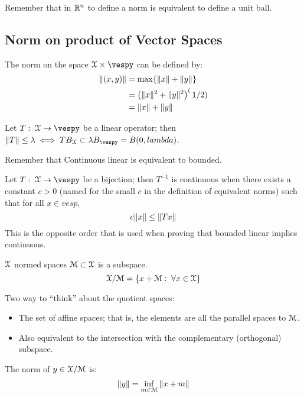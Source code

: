 Remember that in $\mathbb{R}^n$ to define a norm is equivalent to define a unit ball.

\subsection{Norm on product of Vector Spaces}
\begin{examples}
The norm on the space $\vesp\times \vespy$ can be defined by:
\begin{align*}
\Vert (x,y) \Vert &= \max\{\Vert x\Vert + \Vert y \Vert\}\\
            &= \left(\Vert x\Vert^2 + \Vert y \Vert^2\right)^(1/2)\\
            &= \Vert x \Vert + \Vert y \Vert
\end{align*}
\end{examples}

Let $T\from \vesp \to \vespy$ be a linear operator; then $\v T\v \leq \lambda \iff TB_\vesp\subset \lambda B_\vespy=B(0,lambda)$.

\begin{remarks}
Remember that Continuous linear is equivalent to bounded.

Let $T\from \vesp \to \vespy$ be a bijection; then $T^{-1}$ is continuous when there exists a constant $c>0$ (named for the small $c$ in the definition of equivalent norms) such that for all $x\in vesp$,
$$c\Vert x\Vert \leq \Vert Tx\Vert$$
This is the opposite order that is used when proving that bounded linear implies continuous.
\end{remarks}

\begin{ddef}
$\EuScript{X}$ normed spaces $\EuScript{M}\subset \EuScript{X}$ is a subspace.
$$\EuScript{X}/\EuScript{M}= \left\{ x+ \EuScript{M} :\; \forall x\in \EuScript{X}\right\}$$
\end{ddef}
\begin{remarks}
Two way to ``think'' about the quotient spaces:
\begin{itemize}
\item The set of affine spaces; that is, the elements are all the parallel spaces to $\EuScript{M}$.
\item Also equivalent to the intersection with the complementary (orthogonal) subspace.
\end{itemize}
\end{remarks}

\begin{ddef}
The norm of $y \in \EuScript{X}/\EuScript{M}$ is:
$$\Vert y\Vert= \inf_{m\in \EuScript{M}} \Vert x+m\Vert$$
\end{ddef}

